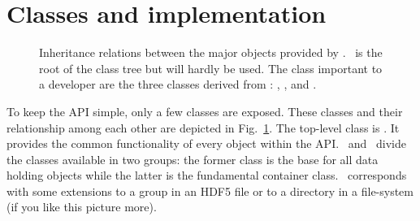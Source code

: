 \section{Classes and implementation}\label{section:classes_implementation}

\begin{figure}[tb]
\centering
{}
\caption{{\small\label{fig:class_inheritance}
Inheritance relations between the major objects provided by \pninx.
\nxobject\ is the root of the class tree but will hardly be used. 
The class important to a developer are the three classes derived from 
\nxobject: \nxfield, \nxgroup, and \nxfile.
}}
\end{figure}
To keep the API simple, only a few classes are exposed. These classes and their 
relationship among each other are depicted in Fig.~\ref{fig:class_inheritance}. 
The top-level class is \nxobject. It provides the common functionality 
of every object within the API. \nxfield\ and \nxgroup\ divide the classes 
available in two groups: the former class is the base for all data holding
objects while the latter is the fundamental container class. 
\nxgroup\ corresponds with some extensions to a group in an HDF5 file or to 
a directory in a file-system (if you like this picture more). 

